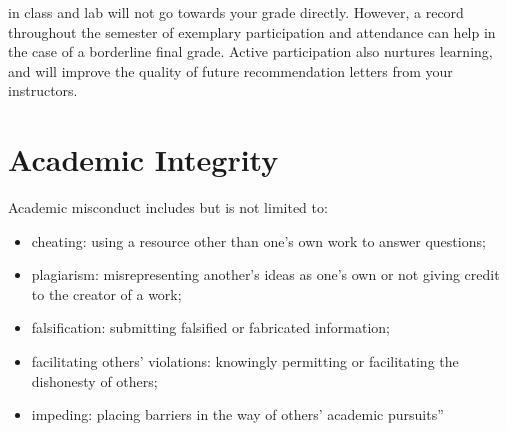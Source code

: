 \documentclass{tufte-handout}
\begin{document}
\begin{fullwidth}
 in class and lab will not go towards your grade directly. However, a record throughout the semester of exemplary participation and attendance can help in the case of a borderline final grade. Active participation also nurtures learning, and will improve the quality of future recommendation letters from your instructors.  

\end{fullwidth}


\section{Academic Integrity}





Academic misconduct includes but is not limited to:

\begin{itemize}
	\item cheating: using a resource other than one's own work to answer questions;
	\item plagiarism: misrepresenting another's ideas as one's own or not giving credit to the creator of a work;
	\item falsification: submitting falsified or fabricated information;
	\item facilitating others' violations: knowingly permitting or facilitating the dishonesty of others;
	\item impeding: placing barriers in the way of others' academic pursuits''
\end{itemize}
\end{document}
